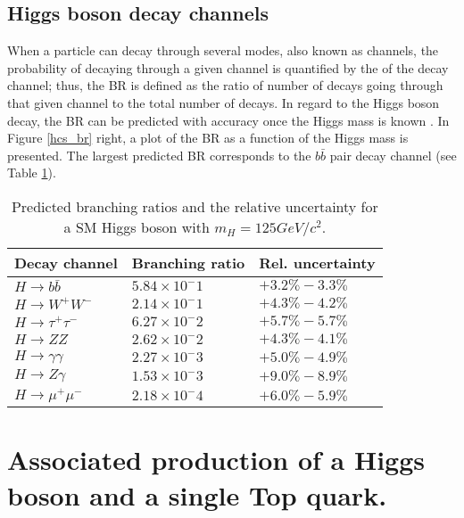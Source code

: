 \subsection{Higgs boson decay channels}\label{sec:decays}

When a particle can decay through several modes, also known as channels, the probability of decaying through a given channel is quantified by the  of the decay channel; thus, the BR is defined as the ratio of number of decays going through that given channel to the total number of decays. In regard to the Higgs boson decay, the BR can be predicted with accuracy once the Higgs mass is known \cite{riley, denner}. In Figure \ref{hcs_br} right, a plot of the BR as a function of the Higgs mass is presented. The largest predicted BR corresponds to the $b\bar{b}$ pair decay channel (see Table \ref{hdbr}). %

\begin{center}
\begin{table}[h]
\centering
\begin{tabular}{lll}\hline
Decay channel       & Branching ratio   & Rel. uncertainty\\\hline
$H\to b\bar{b}$     & $5.84\times10^-1$ & $+3.2\%-3.3\%$\\
$H\to W^+W^-$       & $2.14\times10^-1$ & $+4.3\%-4.2\%$\\
$H\to\tau^+\tau^-$  & $6.27\times10^-2$ & $+5.7\%-5.7\%$\\
$H\to ZZ$           & $2.62\times10^-2$ & $+4.3\%-4.1\%$\\
$H\to \gamma\gamma$ & $2.27\times10^-3$ & $+5.0\%-4.9\%$\\
$H\to Z\gamma$      & $1.53\times10^-3$ & $+9.0\%-8.9\%$\\
$H\to\mu^+\mu^-$    & $2.18\times10^-4$ & $+6.0\%-5.9\%$\\\hline
\end{tabular}
\caption[Predicted branching ratios for a SM Higgs boson with $m_H = 125$ GeV/c$^2$.]{Predicted branching ratios and the relative uncertainty for a SM Higgs boson with $m_H = 125GeV/c^2$.\cite{pdg}}\label{hdbr}
\end{table}
\end{center}
\section{Associated production of a Higgs boson and a single Top quark.}\label{sec:thq}

